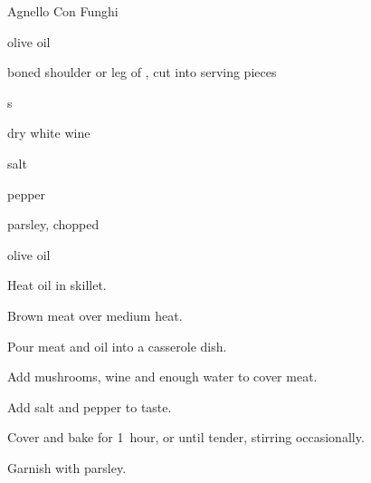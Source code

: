 \begin{recipe}{Agnello Con Funghi}{}{}

\begin{ingredients}
\item {} olive oil
\item {} boned shoulder or leg of , cut into serving pieces
\item {} s
\item {} dry white wine
\item salt
\item pepper
\item parsley, chopped
\item olive oil
\end{ingredients}

\begin{directions}
\item Heat oil in skillet.
\item Brown meat over medium heat.
\item Pour meat and oil into a casserole dish.
\item Add mushrooms, wine and enough water to cover meat.
\item Add salt and pepper to taste.
\item Cover and bake for 1~hour, or until tender, stirring occasionally.
\item Garnish with parsley.
\end{directions}

\end{recipe}
